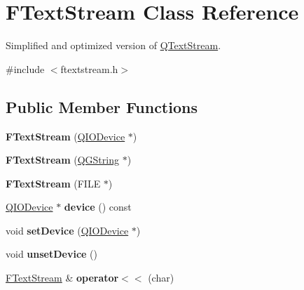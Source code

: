 \hypertarget{class_f_text_stream}{}\section{F\+Text\+Stream Class Reference}
\label{class_f_text_stream}


Simplified and optimized version of \mbox{\hyperlink{class_q_text_stream}{Q\+Text\+Stream}}.  




{\ttfamily \#include $<$ftextstream.\+h$>$}

\subsection*{Public Member Functions}
\begin{DoxyCompactItemize}
\item 
\mbox{\label{class_f_text_stream_a5da2a94e578da2d6a437e5896d04cee2}} 
{\bfseries F\+Text\+Stream} (\mbox{\hyperlink{class_q_i_o_device}{Q\+I\+O\+Device}} $\ast$)
\item 
\mbox{\label{class_f_text_stream_ae5e845f418c192c691b4f56597aa646c}} 
{\bfseries F\+Text\+Stream} (\mbox{\hyperlink{class_q_g_string}{Q\+G\+String}} $\ast$)
\item 
\mbox{\label{class_f_text_stream_aab7ddc66484e8fc42811c9013b2ac302}} 
{\bfseries F\+Text\+Stream} (F\+I\+LE $\ast$)
\item 
\mbox{\label{class_f_text_stream_a0320144a2c4591bcc7329fb6118cf6ea}} 
\mbox{\hyperlink{class_q_i_o_device}{Q\+I\+O\+Device}} $\ast$ {\bfseries device} () const
\item 
\mbox{\label{class_f_text_stream_a1a90f7e23853f2b9f8a7e5470b1e0a30}} 
void {\bfseries set\+Device} (\mbox{\hyperlink{class_q_i_o_device}{Q\+I\+O\+Device}} $\ast$)
\item 
\mbox{\label{class_f_text_stream_a284a01c6b372c3a718c29ea35b829097}} 
void {\bfseries unset\+Device} ()
\item 
\mbox{\label{class_f_text_stream_a1d87a0c4e6838fff7beb42b06f34f71b}} 
\mbox{\hyperlink{class_f_text_stream}{F\+Text\+Stream}} \& {\bfseries operator$<$$<$} (char)

\end{DoxyCompactItemize}
